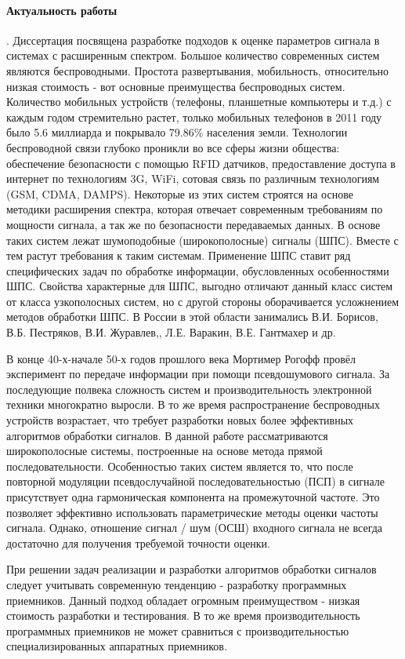 \paragraph{Актуальность работы}. Диссертация посвящена разработке подходов к оценке параметров сигнала
в системах с расширенным спектром.
Большое количество современных систем являются беспроводными. Простота развертывания, мобильность, относительно низкая
стоимость - вот основные преимущества беспроводных систем. Количество мобильных устройств (телефоны, планшетные компьютеры
и т.д.) с каждым годом стремительно растет, только мобильных телефонов в 2011 году было 5.6 миллиарда и покрывало 79.86\%
 населения земли. Технологии беспроводной связи глубоко проникли во все сферы жизни общества:
обеспечение безопасности с помощью RFID датчиков, предоставление доступа в интернет по технологиям 3G, WiFi, 
сотовая связь по различным технологиям (GSM, CDMA, DAMPS). Некоторые из этих систем строятся на основе методики
расширения спектра, которая отвечает современным требованиям по мощности сигнала, а так же по безопасности передаваемых
данных. В основе таких систем лежат шумоподобные (широкополосные) сигналы (ШПС). Вместе с тем растут требования к таким
системам. Применение ШПС ставит ряд специфических задач по обработке информации, обусловленных особенностями ШПС.
Свойства характерные для ШПС, выгодно отличают данный класс систем от класса узкополосных систем, но с другой стороны
оборачивается усложнением методов обработки ШПС. В России в этой области занимались В.И. Борисов, В.Б. Пестряков, В.И. Журавлев,,
Л.Е. Варакин, В.Е. Гантмахер и др.

В конце 40-х-начале 50-х годов прошлого века Мортимер Рогофф провёл эксперимент по передаче информации при помощи
псевдошумового сигнала. За последующие полвека сложность систем и производительность электронной техники многократно
выросли. В то же время распространение беспроводных устройств возрастает, что требует разработки новых более
эффективных алгоритмов обработки сигналов. В данной работе рассматриваются широкополосные системы, построенные на основе метода
прямой последовательности. Особенностью таких систем является то, что после повторной
модуляции псевдослучайной последовательностью (ПСП) в сигнале присутствует одна гармоническая компонента на промежуточной частоте.
Это позволяет эффективно использовать параметрические методы
оценки частоты сигнала. Однако, отношение сигнал / шум (ОСШ) входного сигнала не всегда достаточно для получения требуемой точности оценки.

При решении задач реализации и разработки алгоритмов обработки сигналов следует учитывать современную тенденцию - разработку
программных приемников. Данный подход обладает огромным преимуществом - низкая стоимость разработки и тестирования. В то же
время производительность программных приемников не может сравниться с производительностью специализированных аппаратных приемников.

